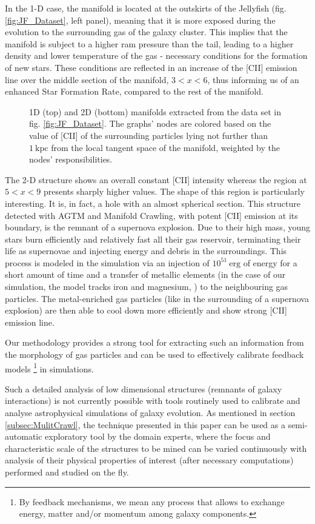 In the 1-D case, the manifold is located at the outskirts of the Jellyfish (fig. \ref{fig:JF_Dataset}, left panel), meaning that it is more exposed during the evolution to the surrounding gas of the galaxy cluster. This implies that the manifold is subject to a higher ram pressure than the tail, leading to a higher density and lower temperature of the gas - necessary conditions for the formation of new stars. These conditions are reflected in an increase of the [CII] emission line over the middle section of the manifold, $3 < x < 6$, thus informing us of an enhanced Star Formation Rate, compared to the rest of the manifold.
\begin{figure}
    \centering
    \caption{1D (top) and 2D (bottom) manifolds extracted from the data set in fig. \ref{fig:JF_Dataset}. The graphs' nodes are colored based on the value of [CII] of the surrounding particles lying not further than $\mathrm{1~kpc}$ from the local tangent space of the manifold, weighted by the nodes' responsibilities.}
    \label{fig:Man2D}
\end{figure}
The 2-D structure shows an overall constant [CII] intensity whereas the region at $5 < x < 9$ presents sharply higher values.
The shape of this region is particularly interesting. It is, in fact, a hole with an almost spherical section. This structure detected with AGTM and Manifold Crawling, with potent [CII] emission at its boundary, is the remnant of a supernova explosion. Due to their high mass, young stars burn efficiently and relatively fast all their gas reservoir, terminating their life as supernovae and injecting energy and debris in the surroundings.
This process is modeled in the simulation via an injection of $10^{51}~\mathrm{erg}$ of energy for a short amount of time and a transfer of metallic elements (in the case of our simulation, the model tracks iron and magnesium, \cite{DeRijcke2013}) to the neighbouring gas particles. The metal-enriched gas particles (like in the surrounding of a supernova explosion) are then able to cool down more efficiently and show strong [CII] emission line. 

Our methodology provides a strong tool for extracting such an information from the morphology of gas particles and can be used to effectively calibrate feedback models \footnote{By feedback mechanisms, we mean any process that allows to exchange energy, matter and/or momentum among galaxy components.} in simulations.

Such a detailed analysis of low dimensional structures (remnants of galaxy interactions) is not currently possible with tools routinely used to calibrate and analyse astrophysical simulations of galaxy evolution.
As mentioned in section \ref{subsec:MulitCrawl}, the technique presented in this paper can be used as a semi-automatic exploratory tool by the domain experts, where the focus and characteristic scale of the structures to be mined can be varied continuously with analysis of their physical properties of interest (after necessary computations) performed and studied on the fly.
